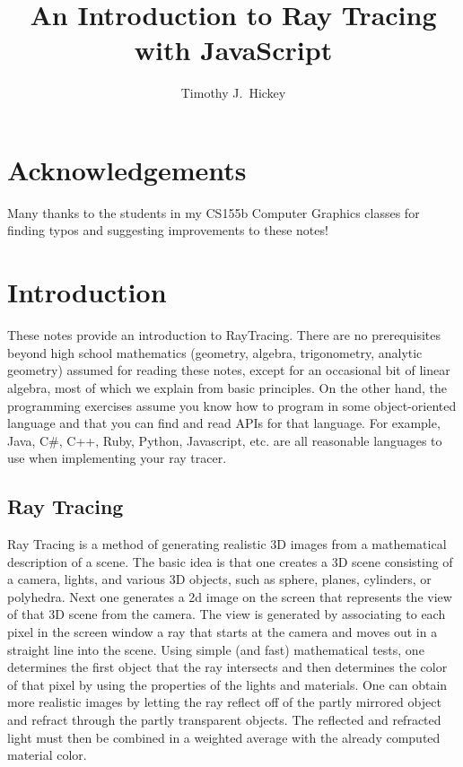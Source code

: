 \documentclass{book}
\title{An Introduction to Ray Tracing with JavaScript}
\author{Timothy J.~Hickey }
\begin{document}

\maketitle






\tableofcontents

\chapter*{Acknowledgements}
Many thanks to the students in my CS155b Computer Graphics classes for finding typos and suggesting improvements to these notes!

\chapter{Introduction}
These notes provide an introduction to RayTracing.  There are no prerequisites beyond high school mathematics (geometry, algebra, trigonometry, analytic geometry) assumed for reading these notes, except for an occasional bit of linear algebra, most of which we explain from basic principles.  On the other hand, the programming exercises assume you know how to program in some object-oriented language and that you can find and read APIs for that language. For example, Java, C\#, C++, Ruby, Python, Javascript, etc. are all reasonable languages to use when implementing your ray tracer.



\section{Ray Tracing}
Ray Tracing is a method of generating realistic 3D images from a mathematical description of a scene. The basic idea
is that one creates a 3D scene consisting of a camera, lights, and various 3D objects, such as sphere, planes, cylinders,
or polyhedra. Next one generates a 2d image on the screen that represents the view of that 3D scene from the camera. The view is generated by associating to each pixel in the screen window a ray that starts at the camera and moves out in a straight line into the
scene. Using simple (and fast) mathematical tests, one determines the first object that the ray intersects and then
determines the color of that pixel by using the properties of the lights and materials. One can obtain more realistic
images by letting the ray reflect off of the partly mirrored object and refract through the partly transparent objects.
The reflected and refracted light must then be combined in a weighted average with the already computed material color.
\end{document}
